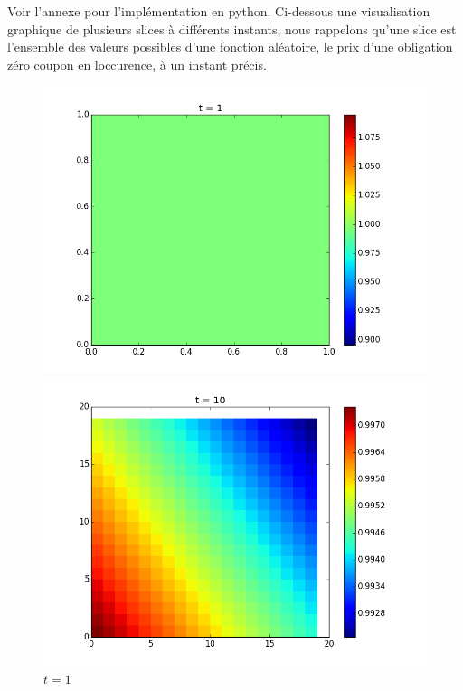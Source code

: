 

Voir l'annexe pour l'implémentation en python.
Ci-dessous une visualisation graphique de plusieurs slices à différents instants, nous rappelons qu'une slice est l'ensemble des valeurs possibles d'une fonction aléatoire, le prix d'une obligation zéro coupon en loccurence, à un instant précis.

\begin{figure}[H]
 \begin{minipage}[b]{.46\linewidth}
  \centering    \includegraphics[scale=0.2]{img/slices2d/sl_1.png}
  \caption{$t = 1$ \label{fig1}}
 \end{minipage} \hfill
 \begin{minipage}[b]{.46\linewidth}
     \centering    \includegraphics[scale=0.2]{img/slices2d/sl_10.png}

\end{minipage}
\end{figure}
